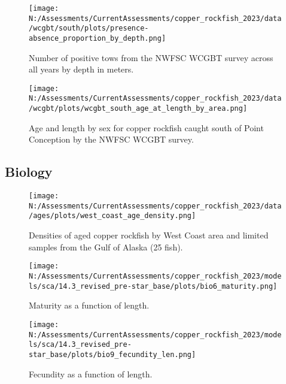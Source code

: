 \documentclass[11pt,
  english,
  letterpaper,
]{article}
\begin{document}
\pagebreak

\begin{figure}
\centering
\texttt{[image: N:/Assessments/CurrentAssessments/copper\_rockfish\_2023/data/wcgbt/south/plots/presence-absence\_proportion\_by\_depth.png]}
\caption{Number of positive tows from the NWFSC WCGBT survey across all years by depth in meters.\label{fig:wcgbt-depth}}
\end{figure}

\pagebreak

\begin{figure}
\centering
\texttt{[image: N:/Assessments/CurrentAssessments/copper\_rockfish\_2023/data/wcgbt/plots/wcgbt\_south\_age\_at\_length\_by\_area.png]}
\caption{Age and length by sex for copper rockfish caught south of Point Conception by the NWFSC WCGBT survey.\label{fig:wcgbt-len-age}}
\end{figure}

\pagebreak

\hypertarget{biology}{%
\subsection{Biology}\label{biology}}

\begin{figure}
\centering
\texttt{[image: N:/Assessments/CurrentAssessments/copper\_rockfish\_2023/data/ages/plots/west\_coast\_age\_density.png]}
\caption{Densities of aged copper rockfish by West Coast area and limited samples from the Gulf of Alaska (25 fish).\label{fig:west-coast-age-density}}
\end{figure}

\pagebreak

\begin{figure}
\centering
\texttt{[image: N:/Assessments/CurrentAssessments/copper\_rockfish\_2023/models/sca/14.3\_revised\_pre-star\_base/plots/bio6\_maturity.png]}
\caption{Maturity as a function of length.\label{fig:maturity}}
\end{figure}

\pagebreak

\begin{figure}
\centering
\texttt{[image: N:/Assessments/CurrentAssessments/copper\_rockfish\_2023/models/sca/14.3\_revised\_pre-star\_base/plots/bio9\_fecundity\_len.png]}
\caption{Fecundity as a function of length.\label{fig:fecundity}}
\end{figure}
\end{document}
